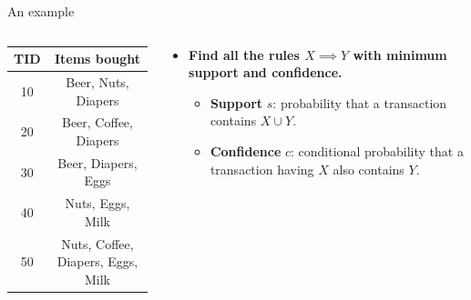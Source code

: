 \documentclass[aspectratio=169,t,xcolor=dvipsnames]{beamer}
\begin{document}
  {
    \begin{frame}{An example}
        \begin{columns}
          \begin{column}{0.4\textwidth}
          \begin{tabular}{|c|c|}
          \hline
          \textbf{TID} & \textbf{Items bought}\\\hline
          10 & Beer, Nuts, Diapers \\\hline
          20 & Beer, Coffee, Diapers \\\hline
          30 & Beer, Diapers, Eggs \\\hline
          40 & Nuts, Eggs, Milk \\\hline
          50 & Nuts, Coffee, Diapers, Eggs, Milk\\\hline
          \end{tabular}
          \end{column}
          \begin{column}{0.5\textwidth}
          \vspace{-2cm}
          \begin{itemize}
            \item \textbf{Find all the rules $X \implies Y$ with minimum support and confidence.}
            \begin{itemize}
              \item \textbf{Support} $s$: probability that a transaction contains $X \cup Y$.
              \item \textbf{Confidence} $c$: conditional probability that a transaction having $X$ also contains $Y$.
            \end{itemize}

\end{itemize}
\end{column}
\end{columns}
\end{frame}}
\end{document}
